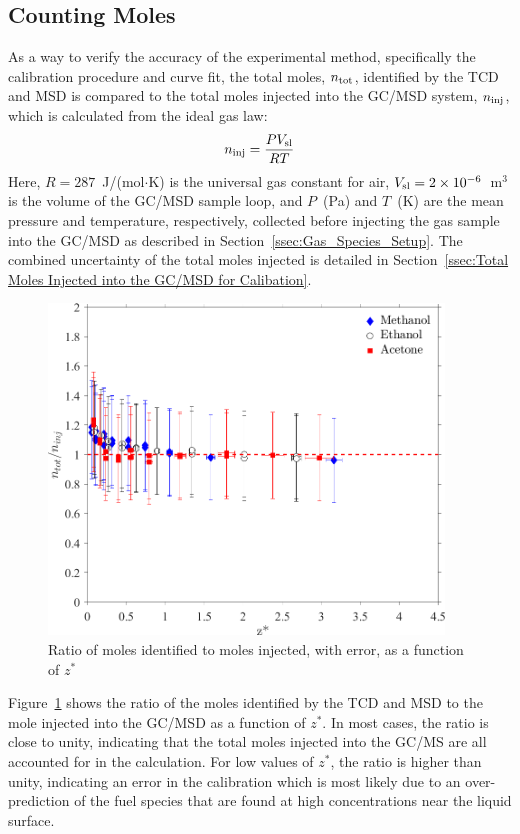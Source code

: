 \documentclass[12pt]{article}
\begin{document}
\subsection{Counting Moles}

As a way to verify the accuracy of the experimental method, specifically the calibration procedure and curve fit, the total moles, $n_{\rm tot}$, identified by the TCD and MSD is compared to the total moles injected into the GC/MSD system, $n_{\rm inj}$, which is calculated from the ideal gas law:
\begin{equation}\label{eq:moles_inj}
n_{\rm inj}=\frac{PV_{\rm sl}}{RT}
\end{equation}
Here, $R=287$~J/(mol$\cdot$K) is the universal gas constant for air, $V_{\rm sl}=2\times 10^{-6}$~m$^3$ is the volume of the GC/MSD sample loop, and $P$~(Pa) and $T$~(K) are the mean pressure and temperature, respectively, collected before injecting the gas sample into the GC/MSD as described in Section~\ref{ssec:Gas_Species_Setup}. The combined uncertainty of the total moles injected is detailed in Section~\ref{ssec:Total Moles Injected into the GC/MSD for Calibation}.

\begin{figure}[h!]
	\centering
\includegraphics[width=10.5cm,keepaspectratio]{mole_ratio_Comparison.png}
	\caption[Ratio of moles identified to moles injected]{Ratio of moles identified to moles injected, with error, as a function of $z^*$}
	\label{fig:Mole_Comp}
\end{figure}

Figure~\ref{fig:Mole_Comp} shows the ratio of the moles identified by the TCD and MSD to the mole injected into the GC/MSD as a function of $z^*$. In most cases, the ratio is close to unity, indicating that the total moles injected into the GC/MS are all accounted for in the calculation. For low values of $z^*$, the ratio is higher than unity, indicating an error in the calibration which is most likely due to an over-prediction of the fuel species that are found at high concentrations near the liquid surface. 
\end{document}
